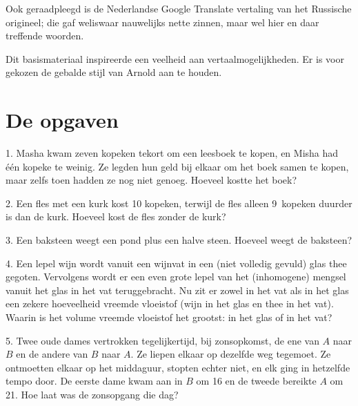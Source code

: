 Ook geraadpleegd is de Nederlandse Google Translate vertaling van het Russische origineel; die gaf weliswaar nauwelijks nette zinnen, maar wel hier en daar treffende woorden.

Dit basismateriaal inspireerde een veelheid aan vertaalmogelijk\-heden. Er is voor gekozen de gebalde stijl van Arnold aan te houden.

\clearpage

\section*{De opgaven}

\begin{problem}{1.}
	Masha kwam zeven kopeken tekort om een leesboek te kopen, en Misha had één kopeke te weinig. Ze legden hun geld bij elkaar om het boek samen te kopen, maar zelfs toen hadden ze nog niet genoeg. Hoeveel kostte het boek?
\end{problem}

\begin{problem}{2.}
	Een fles met een kurk kost 10 kopeken, terwijl de fles alleen 9~kopeken duurder is dan de kurk. Hoeveel kost de fles zonder de kurk?
\end{problem}

\begin{problem}{3.}
	Een baksteen weegt een pond plus een halve steen. Hoeveel weegt de baksteen?
\end{problem}

\begin{problem}{4.}
	Een lepel wijn wordt vanuit een wijnvat in een (niet volledig gevuld) glas thee gegoten. Vervolgens wordt er een even grote lepel van het (inhomogene) mengsel vanuit het glas in het vat teruggebracht. Nu zit er zowel in het vat als in het glas een zekere hoeveelheid vreemde vloeistof (wijn in het glas en thee in het vat). Waarin is het volume vreemde vloeistof het grootst: in het glas of in het vat?
\end{problem}

\begin{problem}{5.}
	Twee oude dames vertrokken tegelijkertijd, bij zonsopkomst, de ene van $A$ naar $B$ en de andere van $B$ naar $A$. Ze liepen elkaar op dezelfde weg tegemoet. Ze ontmoetten elkaar op het middaguur, stopten echter niet, en elk ging in hetzelfde tempo door. De eerste dame kwam aan in $B$ om \SI{16}{\uur} en de tweede bereikte $A$ om \SI{21}{\uur}. Hoe laat was de zonsopgang die dag?
\end{problem}

